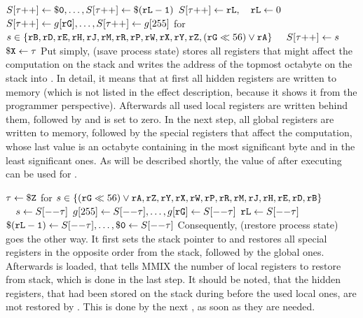 \instrtblsix
	{}
	{$S[\tau{\tt ++}] \leftarrow {\tt \$0}, \dots, S[\tau{\tt ++}] \leftarrow {\tt \$({\tt rL} - 1)}$}
	{$S[\tau{\tt ++}] \leftarrow {\tt rL}, \quad {\tt rL} \leftarrow 0$}
	{$S[\tau{\tt ++}] \leftarrow g[{\tt rG}], \dots, S[\tau{\tt ++}] \leftarrow g[255]$}
	{for $s \in \{{\tt rB},{\tt rD},{\tt rE},{\tt rH},{\tt rJ},{\tt rM},{\tt rR},{\tt rP},{\tt rW},{\tt rX},{\tt rY},{\tt rZ},({\tt rG} \ll 56) \lor {\tt rA}\}$}
	{$\quad S[\tau{\tt ++}] \leftarrow s$}
	{${\tt \$X} \leftarrow \tau$}
\noindent Put simply,  (\i{save process state}) stores all registers that might affect the computation on the stack and writes the address of the topmost octabyte on the stack into . In detail, it means that at first all hidden registers are written to memory (which is not listed in the effect description, because it shows it from the programmer perspective). Afterwards all used local registers are written behind them, followed by  and  is set to zero. In the next step, all global registers are written to memory, followed by the special registers that affect the computation, whose last value is an octabyte containing  in the most significant byte and  in the least significant ones. As will be described shortly, the value of  after executing  can be used for . \citep[pg. 34]{mmix-doc}

\instrtblsix
	{}
	{$\tau \leftarrow {\tt \$Z}$}
	{for $s \in \{({\tt rG} \ll 56) \lor {\tt rA},{\tt rZ},{\tt rY},{\tt rX},{\tt rW},{\tt rP},{\tt rR},{\tt rM},{\tt rJ},{\tt rH},{\tt rE},{\tt rD},{\tt rB}\}$}
	{$\quad s \leftarrow S[{\tt --}\tau]$}
	{$g[255] \leftarrow S[{\tt --}\tau], \dots, g[{\tt rG}] \leftarrow S[{\tt --}\tau]$}
	{${\tt rL} \leftarrow S[{\tt --}\tau]$}
	{${\tt \$({\tt rL} - 1)} \leftarrow S[{\tt --}\tau], \dots, {\tt \$0} \leftarrow S[{\tt --}\tau]$}
\noindent Consequently,  (\i{restore process state}) goes the other way. It first sets the stack pointer to  and restores all special registers in the opposite order from the stack, followed by the global ones. Afterwards  is loaded, that tells MMIX the number of local registers to restore from stack, which is done in the last step. \citep[pg. 34]{mmix-doc} It should be noted, that the hidden registers, that had been stored on the stack during  before the used local ones, are \i{not} restored by . This is done by the next , \ie as soon as they are needed.

